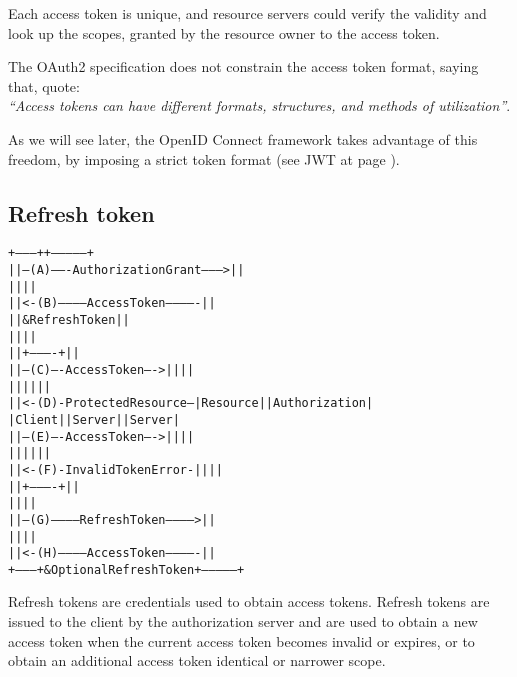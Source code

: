 Each access token is unique, and resource servers could verify the validity and
look up the scopes, granted by the resource owner to the access token.

The OAuth2 specification does not constrain the access token format, saying
that, quote: \\
\textit{``Access tokens can have different formats, structures, and methods of
utilization''}.

As we will see later, the OpenID Connect framework takes advantage of this
freedom, by imposing a strict token format (see JWT at page \pageref{jwt}).

\subsection{Refresh token}
\begin{alltt}
  +--------+                                           +---------------+
  |        |--(A)------- Authorization Grant --------->|               |
  |        |                                           |               |
  |        |<-(B)----------- Access Token -------------|               |
  |        |               & Refresh Token             |               |
  |        |                                           |               |
  |        |                            +----------+   |               |
  |        |--(C)---- Access Token ---->|          |   |               |
  |        |                            |          |   |               |
  |        |<-(D)- Protected Resource --| Resource |   | Authorization |
  | Client |                            |  Server  |   |     Server    |
  |        |--(E)---- Access Token ---->|          |   |               |
  |        |                            |          |   |               |
  |        |<-(F)- Invalid Token Error -|          |   |               |
  |        |                            +----------+   |               |
  |        |                                           |               |
  |        |--(G)----------- Refresh Token ----------->|               |
  |        |                                           |               |
  |        |<-(H)----------- Access Token -------------|               |
  +--------+           & Optional Refresh Token        +---------------+
\end{alltt}

Refresh tokens are credentials used to obtain access tokens. Refresh tokens are
issued to the client by the authorization server and are used to obtain a new
access token when the current access token becomes invalid or expires, or to
obtain an additional access token identical or narrower scope.

